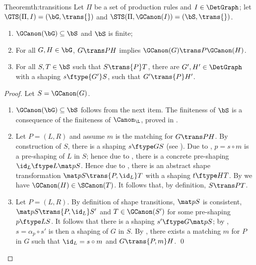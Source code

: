 \begin{oldresult}{Theorem}{th:transitions}
Let $\Pi$ be a set of production rules and $I\in \DetGraph$; let
$\GTS(\Pi,I)=(\bG,{\trans{}})$ and $\STS(\Pi, \GCanon(I))=(\bS,{\trans{}})$.
\begin{enumerate}\noitemsep\smalltopsep
\item $\GCanon(\bG) \subseteq \bS$ and $\bS$ is finite;
\item For all $G,H\in \bG$, $G\trans P H$ implies $\GCanon(G) \trans P
  \GCanon(H)$.
\item For all $S,T\in \bS$ such that $S\trans{P} T$, there are $G',H'\in
  \DetGraph$ with a shaping $s\ftype{G'}S$, such that $G'\trans{P} H'$.
\end{enumerate}
\end{oldresult}
%
\begin{proof} Let $S=\GCanon(G)$.
\begin{enumerate}
\item $\GCanon(\bG)\subseteq \bS$ follows from the next item. The finiteness of 
  $\bS$ is a consequence of the finiteness of $\Canon_\L$, proved in
  \cite{Rens04-esop}.
\item Let $P=(L,R)$ and assume $m$ is the matching for $G\trans P H$. By
  construction of $S$, there is a shaping $s\ftype G S$ (see
  ). Due to , $p=s\circ m$ is a pre-shaping
  of $L$ in $S$; hence due to , there is a concrete
  pre-shaping $\id_L\ftype L{\mat p S}$. Hence due to , there is
  an abstract shape transformation $\mat p S\trans{P,\id_L} T$ with a shaping
  $t\ftype H T$. By  we have $\GCanon(H)\in \SCanon(T)$. It
  follows that, by definition, $S\trans P T$.
\item Let $P=(L,R)$. By definition of shape transitions, $\mat p S$ is
  consistent, $\mat p S\trans{P,\id_L} S'$ and $T\in \GCanon(S')$ for some
  pre-shaping $p\ftype L S$. It follows that there is a shaping $s'\ftype G{\mat
  p S}$; by , $s=\alpha_p\circ s'$ is then a shaping of $G$ in
  $S$. By , there exists a matching $m$ for $P$ in $G$ such that
  $\id_L=s\circ m$ and $G\trans{P,m} H$.  \qed
\end{enumerate}
\end{proof}

